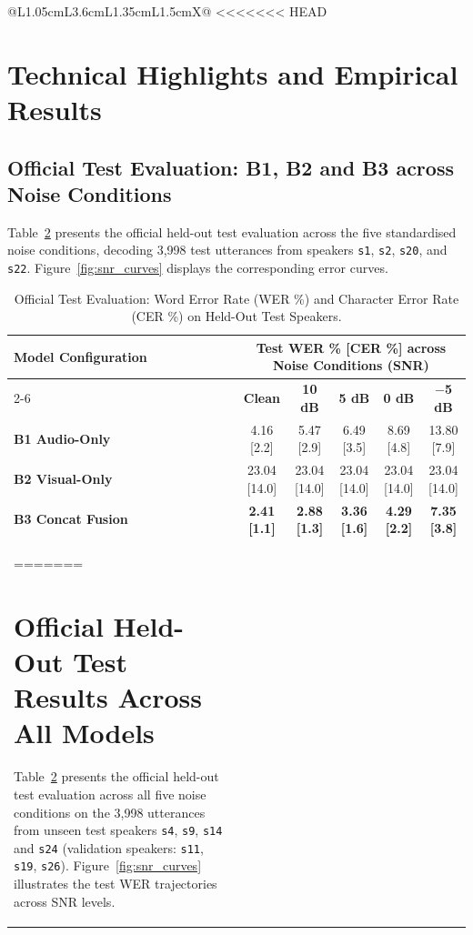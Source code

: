 \documentclass[11pt,a4paper]{article}
\newcommand{\code}[1]{\texttt{\small #1}}
\begin{document}
\begin{table}[htbp]
\begin{tabularx}{\textwidth}{@{}L{1.05cm}L{3.6cm}L{1.35cm}L{1.5cm}X@{}}
<<<<<<< HEAD
\section{Technical Highlights and Empirical Results}

\subsection{Official Test Evaluation: B1, B2 and B3 across Noise Conditions}
Table~\ref{tab:baseline_results} presents the official held-out test evaluation across the five standardised noise conditions, decoding 3,998 test utterances from speakers \code{s1}, \code{s2}, \code{s20}, and \code{s22}. Figure~\ref{fig:snr_curves} displays the corresponding error curves.

\begin{table}[htbp]
\centering\small
\caption{Official Test Evaluation: Word Error Rate (WER \%) and Character Error Rate (CER \%) on Held-Out Test Speakers.}
\label{tab:baseline_results}
\begin{tabularx}{\textwidth}{@{}lccccc@{}}
\toprule
\rowcolor{white}\sffamily\bfseries Model Configuration & \multicolumn{5}{c}{\sffamily\bfseries Test WER \% [CER \%] across Noise Conditions (SNR)} \\
\cmidrule(lr){2-6}
& \textbf{Clean} & \textbf{10 dB} & \textbf{5 dB} & \textbf{0 dB} & \textbf{$-$5 dB} \\
\midrule
\textbf{B1 Audio-Only} & 4.16 [2.2] & 5.47 [2.9] & 6.49 [3.5] & 8.69 [4.8] & 13.80 [7.9] \\
\textbf{B2 Visual-Only} & 23.04 [14.0] & 23.04 [14.0] & 23.04 [14.0] & 23.04 [14.0] & 23.04 [14.0] \\
\textbf{B3 Concat Fusion} & \textbf{2.41 [1.1]} & \textbf{2.88 [1.3]} & \textbf{3.36 [1.6]} & \textbf{4.29 [2.2]} & \textbf{7.35 [3.8]} \\
=======
\section{Official Held-Out Test Results Across All Models}

Table~\ref{tab:baseline_results} presents the official held-out test evaluation across all five noise conditions on the 3,998 utterances from unseen test speakers \code{s4}, \code{s9}, \code{s14} and \code{s24} (validation speakers: \code{s11}, \code{s19}, \code{s26}). Figure~\ref{fig:snr_curves} illustrates the test WER trajectories across SNR levels.


\end{tabularx}
\end{table}
\end{tabularx}
\end{table}
\end{document}
